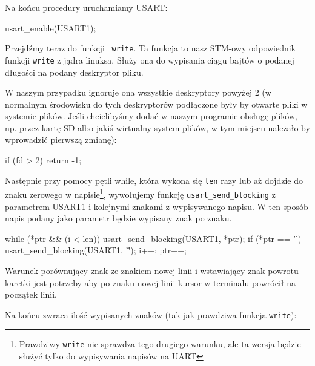 \documentclass{pdfBooklets}
\begin{document}
  
Na końcu procedury uruchamiamy USART:

\begin{CodeFrame*}[c]{}
  usart_enable(USART1);
\end{CodeFrame*}

Przejdźmy teraz do funkcji \Verb$_write$. Ta funkcja to nasz STM-owy odpowiednik funkcji \Verb$write$ z jądra linuksa. Służy ona do wypisania ciągu
bajtów o podanej długości na podany deskryptor pliku.

W naszym przypadku ignoruje ona wszystkie deskryptory powyżej 2 (w normalnym środowisku do tych deskryptorów podłączone były by otwarte pliki w systemie
plików. Jeśli chcielibyśmy dodać w naszym programie obsługę plików, np. przez kartę SD albo jakiś wirtualny system plików, w tym miejscu
należało by wprowadzić pierwszą zmianę):

\begin{CodeFrame*}[c]{}
  if (fd > 2) {
    return -1;
  }
\end{CodeFrame*}

Następnie przy pomocy pętli while, która wykona się \Verb$len$ razy lub aż dojdzie do znaku zerowego w napisie\footnote{Prawdziwy \Verb$write$ nie
  sprawdza tego drugiego warunku, ale ta wersja będzie służyć tylko do wypisywania napisów na UART}, wywołujemy funkcję \Verb$usart_send_blocking$
z parametrem USART1 i kolejnymi znakami z wypisywanego napisu. W ten sposób napis podany jako parametr będzie wypisany znak po znaku.

\begin{CodeFrame*}[c]{}
  while (*ptr && (i < len)) {
    usart_send_blocking(USART1, *ptr);
    if (*ptr == '\n') {
      usart_send_blocking(USART1, '\r');
    }
    i++; 
    ptr++;
  }
\end{CodeFrame*}

Warunek porównujący znak ze znakiem nowej linii i wstawiający znak powrotu karetki jest potrzeby aby po znaku nowej linii kursor w terminalu powrócił
na początek linii.

Na końcu zwraca ilość wypisanych znaków (tak jak prawdziwa funkcja \Verb$write$):
\end{document}
